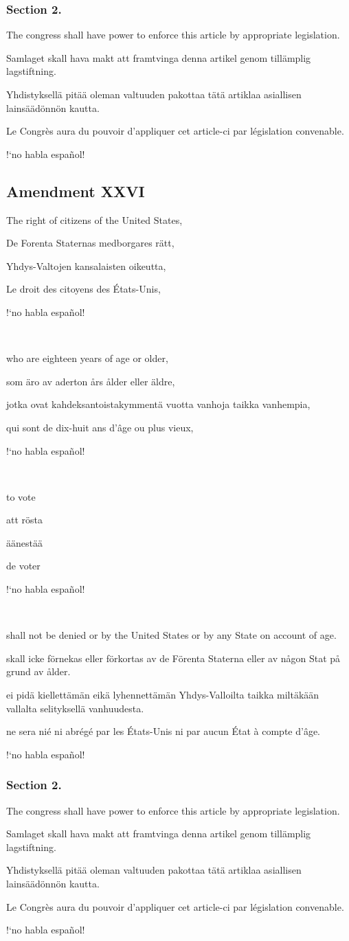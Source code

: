 \documentclass[a4paper,landscape,10pt]{article}
\newcommand{\tblock}[5]{\noindent\begin{minipage}[t]{0.18\textwidth}\foreignlanguage{english}{#1}\end{minipage}\hskip 0.025\textwidth\begin{minipage}[t]{0.18\textwidth}\foreignlanguage{swedish}{#2}\end{minipage}\hskip 0.025\textwidth\begin{minipage}[t]{0.18\textwidth}\foreignlanguage{finnish}{#3}\end{minipage}\hskip 0.025\textwidth\begin{minipage}[t]{0.18\textwidth}\foreignlanguage{french}{#4}\end{minipage}\hskip 0.025\textwidth\begin{minipage}[t]{0.18\textwidth}\foreignlanguage{spanish}{#5}\end{minipage}}
\begin{document}
\subsubsection*{Section 2.}
\tblock
{The \Gls{congress} shall have power to enforce this article by appropriate legislation.}
{Samlaget skall hava makt att framtvinga denna artikel genom tillämplig lagstiftning.}
{Yhdistyksellä pitää oleman valtuuden pakottaa tätä artiklaa asiallisen lainsäädönnön kautta.}
{Le Congrès aura du pouvoir d'appliquer cet article-ci par législation convenable.}
{!`no habla español!}

\subsection*{Amendment XXVI}
\tblock
{The right of citizens of the United States,}
{De Forenta Staternas medborgares rätt,}
{Yhdys-Valtojen kansalaisten oikeutta,}
{Le droit des citoyens des États-Unis,}
{!`no habla español!}


~

\tblock
{who are eighteen years of age or older,}
{som äro av aderton års ålder eller äldre,}
{jotka ovat kahdeksantoistakymmentä vuotta vanhoja taikka vanhempia,}
{qui sont de dix-huit ans d'âge ou plus vieux,}
{!`no habla español!}

~

\tblock
{to vote}
{att rösta}
{äänestää}
{de voter}
{!`no habla español!}

~

\tblock
{shall not be denied or  by the United States or by any State on account of age.}
{skall icke förnekas eller förkortas av de Förenta Staterna eller av någon Stat på grund av ålder.}
{ei pidä kiellettämän eikä lyhennettämän Yhdys-Valloilta taikka miltäkään vallalta selityksellä vanhuudesta.}
{ne sera nié ni abrégé par les États-Unis ni par aucun État à compte d'âge.}
{!`no habla español!}

\subsubsection*{Section 2.}
\tblock
{The \Gls{congress} shall have power to enforce this article by appropriate legislation.}
{Samlaget skall hava makt att framtvinga denna artikel genom tillämplig lagstiftning.}
{Yhdistyksellä pitää oleman valtuuden pakottaa tätä artiklaa asiallisen lainsäädönnön kautta.}
{Le Congrès aura du pouvoir d'appliquer cet article-ci par législation convenable.}
{!`no habla español!}
\end{document}
